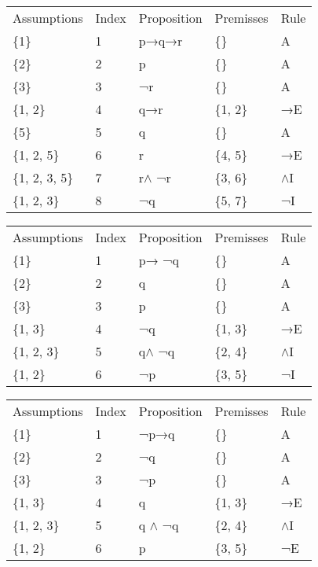 \documentclass[a4paper,12pt]{book}
\begin{document}
\begin{tabular}{lllll}
\toprule
 Assumptions & Index & Proposition & Premisses & Rule \\
         \{1\} &     1 &       p→q→r &        \{\} &    A \\
\midrule
         \{2\} &     2 &           p &        \{\} &    A \\
         \{3\} &     3 &          ¬r &        \{\} &    A \\
      \{1, 2\} &     4 &         q→r &    \{1, 2\} &   →E \\
         \{5\} &     5 &           q &        \{\} &    A \\
   \{1, 2, 5\} &     6 &           r &    \{4, 5\} &   →E \\
\{1, 2, 3, 5\} &     7 &       r$\wedge$ ¬r &    \{3, 6\} &   $\wedge$I \\
   \{1, 2, 3\} &     8 &          ¬q &    \{5, 7\} &   ¬I \\
\bottomrule
\end{tabular}
\begin{tabular}{lllll}
\toprule
Assumptions & Index & Proposition & Premisses & Rule \\
        \{1\} &     1 &       p→ ¬q &        \{\} &    A \\
\midrule
        \{2\} &     2 &           q &        \{\} &    A \\
        \{3\} &     3 &           p &        \{\} &    A \\
     \{1, 3\} &     4 &          ¬q &    \{1, 3\} &   →E \\
  \{1, 2, 3\} &     5 &       q$\wedge$ ¬q &    \{2, 4\} &   $\wedge$I \\
     \{1, 2\} &     6 &          ¬p &    \{3, 5\} &   ¬I \\
\bottomrule
\end{tabular}
\begin{tabular}{lllll}
\toprule
Assumptions & Index & Proposition & Premisses & Rule \\
        \{1\} &     1 &        ¬p→q &        \{\} &    A \\
\midrule
        \{2\} &     2 &          ¬q &        \{\} &    A \\
        \{3\} &     3 &          ¬p &        \{\} &    A \\
     \{1, 3\} &     4 &           q &    \{1, 3\} &   →E \\
  \{1, 2, 3\} &     5 &       q $\wedge$ ¬q &    \{2, 4\} &   $\wedge$I \\
     \{1, 2\} &     6 &           p &    \{3, 5\} &   ¬E \\
\bottomrule
\end{tabular}
\end{document}
